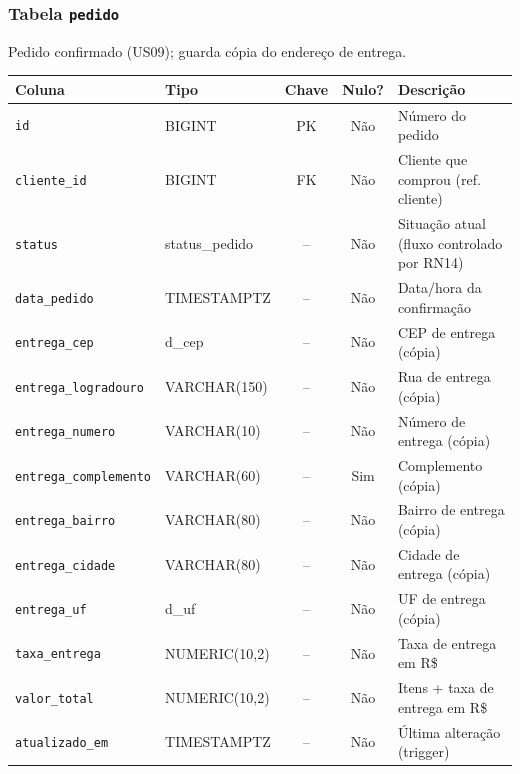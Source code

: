 \subsubsection{Tabela \texttt{pedido}}
\noindent Pedido confirmado (US09); guarda cópia do endereço de entrega.\par\smallskip
\begingroup\footnotesize\renewcommand{\arraystretch}{1.2}
\begin{longtable}{|p{3.0cm}|p{2.6cm}|c|c|p{5.6cm}|}
\hline
\rowcolor{gray!40}\textbf{Coluna} & \textbf{Tipo} & \textbf{Chave} & \textbf{Nulo?} & \textbf{Descrição} \\ \hline
\endhead
\texttt{id} & BIGINT & PK & Não & Número do pedido \\ \hline
\texttt{cliente\_id} & BIGINT & FK & Não & Cliente que comprou (ref. cliente) \\ \hline
\texttt{status} & status\_pedido & -- & Não & Situação atual (fluxo controlado por RN14) \\ \hline
\texttt{data\_pedido} & TIMESTAMPTZ & -- & Não & Data/hora da confirmação \\ \hline
\texttt{entrega\_cep} & d\_cep & -- & Não & CEP de entrega (cópia) \\ \hline
\texttt{entrega\_logradouro} & VARCHAR(150) & -- & Não & Rua de entrega (cópia) \\ \hline
\texttt{entrega\_numero} & VARCHAR(10) & -- & Não & Número de entrega (cópia) \\ \hline
\texttt{entrega\_complemento} & VARCHAR(60) & -- & Sim & Complemento (cópia) \\ \hline
\texttt{entrega\_bairro} & VARCHAR(80) & -- & Não & Bairro de entrega (cópia) \\ \hline
\texttt{entrega\_cidade} & VARCHAR(80) & -- & Não & Cidade de entrega (cópia) \\ \hline
\texttt{entrega\_uf} & d\_uf & -- & Não & UF de entrega (cópia) \\ \hline
\texttt{taxa\_entrega} & NUMERIC(10,2) & -- & Não & Taxa de entrega em R\$ \\ \hline
\texttt{valor\_total} & NUMERIC(10,2) & -- & Não & Itens + taxa de entrega em R\$ \\ \hline
\texttt{atualizado\_em} & TIMESTAMPTZ & -- & Não & Última alteração (trigger) \\ \hline
\end{longtable}
\endgroup
